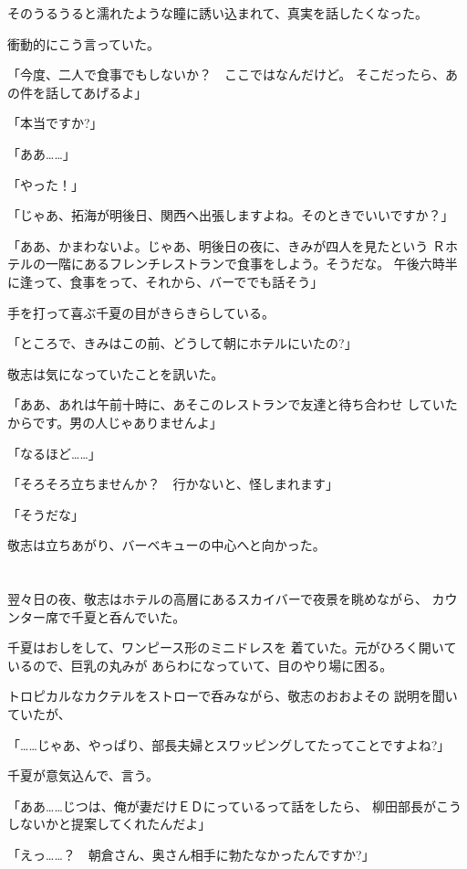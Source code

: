 ﻿\documentclass[
    book,tate,
    line_length=30zw,
    jafontsize=12pt,
    paper=b5j,
    landscape,
    ]{jlreq}
\begin{document}
そのうるうると濡れたような瞳に誘い込まれて、真実を話したくなった。

衝動的にこう言っていた。

「今度、二人で食事でもしないか？　ここではなんだけど。
そこだったら、あの件を話してあげるよ」

「本当ですか?」

「ああ……」

「やった！」

「じゃあ、拓海が明後日、関西へ出張しますよね。そのときでいいですか？」

「ああ、かまわないよ。じゃあ、明後日の夜に、きみが四人を見たという
Ｒホテルの一階にあるフレンチレストランで食事をしよう。そうだな。
午後六時半に逢って、食事をって、それから、バーででも話そう」

手を打って喜ぶ千夏の目がきらきらしている。

「ところで、きみはこの前、どうして朝にホテルにいたの?」

敬志は気になっていたことを訊いた。

「ああ、あれは午前十時に、あそこのレストランで友達と待ち合わせ
していたからです。男の人じゃありませんよ」

「なるほど……」

「そろそろ立ちませんか？　行かないと、怪しまれます」

「そうだな」

敬志は立ちあがり、バーベキューの中心へと向かった。

\section*{}

翌々日の夜、敬志はホテルの高層にあるスカイバーで夜景を眺めながら、
カウンター席で千夏と呑んでいた。

千夏はおしをして、ワンピース形のミニドレスを
着ていた。元がひろく開いているので、巨乳の丸みが
あらわになっていて、目のやり場に困る。

トロピカルなカクテルをストローで呑みながら、敬志のおおよその
説明を聞いていたが、

「……じゃあ、やっぱり、部長夫婦とスワッピングしてたってことですよね?」

千夏が意気込んで、言う。

「ああ……じつは、俺が妻だけＥＤにっているって話をしたら、
柳田部長がこうしないかと提案してくれたんだよ」

「えっ……？　朝倉さん、奥さん相手に勃たなかったんですか?」
\end{document}
